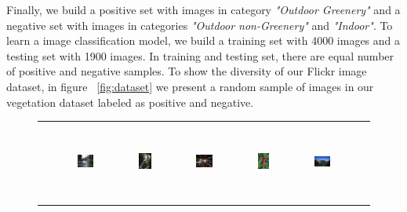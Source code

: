 Finally, we build a positive set with images in category \textit{"Outdoor Greenery"} and a negative set 
with images in categories \textit{"Outdoor non-Greenery"} and \textit{"Indoor"}. To learn a image classification model, we build a training set with 4000 images and a testing set with 1900 images. In training and testing set, there are equal number of positive and negative samples.
To show the diversity of our Flickr image dataset, in figure ~\ref{fig:dataset} we present a random sample of images in our vegetation dataset labeled as positive and negative.









\begin{figure}[th]
{\small{
\begin{center}
\begin{tabular}{@{}c@{\,\,\,}c@{\,\,\,}c@{\,\,\,}c@{\,\,\,}c@{\,\,\,}}
\includegraphics[width=0.19\textwidth]{imggrid/datasetposi/1.jpg} &
\includegraphics[height=1in]{imggrid/datasetposi/2.jpg} &
\includegraphics[width=0.19\textwidth]{imggrid/datasetposi/3.jpg} &
\includegraphics[height=1in]{imggrid/datasetposi/4.jpg} &
\includegraphics[width=0.19\textwidth]{imggrid/datasetposi/5.jpg} \\

\end{tabular}
\end{center}}}
\end{figure}
